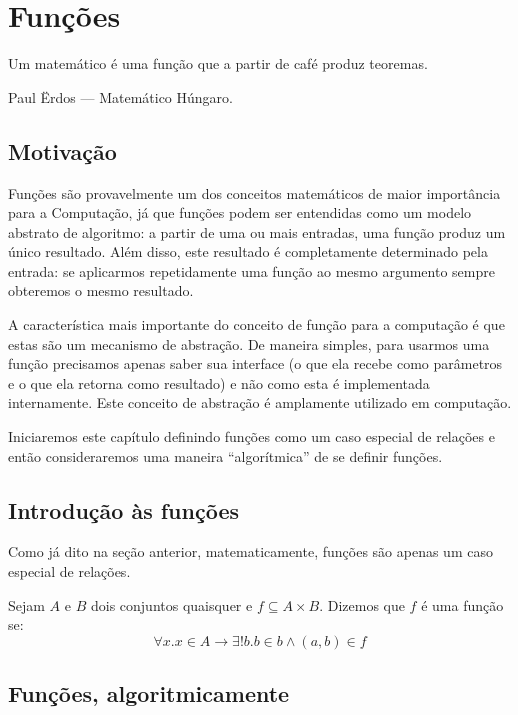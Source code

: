 \chapter{Funções}\label{cap8}

\epigraph{Um matemático é uma função que a partir de café produz
  teoremas.}{Paul Ërdos --- Matemático Húngaro.}

\section{Motivação}

Funções são provavelmente um dos conceitos matemáticos de maior
importância para a Computação, já que funções podem ser entendidas
como um modelo abstrato de algoritmo: a partir de uma ou mais
entradas, uma função produz um único resultado. Além disso, este
resultado é completamente determinado pela entrada: se aplicarmos
repetidamente uma função ao mesmo argumento sempre obteremos o mesmo
resultado.

A característica mais importante do conceito de função para a
computação é que estas são um mecanismo de abstração. De maneira
simples, para usarmos uma função precisamos apenas saber sua interface
(o que ela recebe como parâmetros e o que ela retorna como resultado)
e não como esta é implementada internamente. Este conceito de
abstração é amplamente utilizado em computação.

Iniciaremos este capítulo definindo funções como um caso especial de
relações e então consideraremos uma maneira ``algorítmica'' de se
definir funções.

\section{Introdução às funções}

Como já dito na seção anterior, matematicamente, funções são apenas um
caso especial de relações.

\begin{Definition}[Função]
Sejam $A$ e $B$ dois conjuntos quaisquer e $f \subseteq A \times
B$. Dizemos que $f$ é uma função se:
\[
\forall x. x\in A \to \exists ! b. b\in b \land (a,b) \in f
\]
\end{Definition}

\section{Funções, algoritmicamente}


